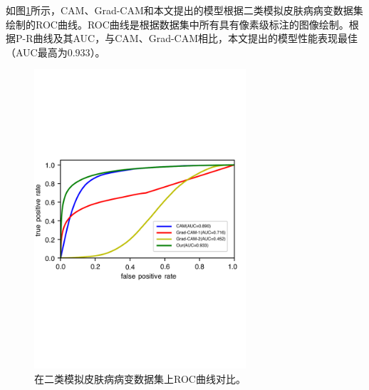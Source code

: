 如图\ref{fig:roc_cam_grad_cam_our_simulated_skin_datasets}所示，CAM、Grad-CAM和本文提出的模型根据二类模拟皮肤病病变数据集绘制的ROC曲线。ROC曲线是根据数据集中所有具有像素级标注的图像绘制。根据P-R曲线及其AUC，与CAM、Grad-CAM相比，本文提出的模型性能表现最佳（AUC最高为$0.933$）。
\begin{figure}[H]
	\centering
	\includegraphics[width=0.7\textwidth]{figure/ROC_cam_grad_cam_our_simulated_skin_datasets}
	\caption[在二类模拟皮肤病病变数据集上ROC曲线对比]{在二类模拟皮肤病病变数据集上ROC曲线对比。}
	
	\label{fig:roc_cam_grad_cam_our_simulated_skin_datasets}
\end{figure}

